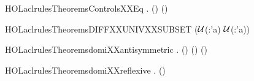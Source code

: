 \newcommand{\HOLaclrulesTheoremsandXXsaysXXlemma}{\UseVerbatim{HOLaclrulesTheoremsandXXsaysXXlemma}}
\begin{SaveVerbatim}{HOLaclrulesTheoremsControlsXXEq}
\HOLTokenTurnstile{} \HOLSymConst{\HOLTokenForall{}}    .
     (\HOLSymConst{,}\HOLSymConst{,})     \HOLSymConst{\HOLTokenEquiv{}} (\HOLSymConst{,}\HOLSymConst{,})      
\end{SaveVerbatim}
\newcommand{\HOLaclrulesTheoremsControlsXXEq}{\UseVerbatim{HOLaclrulesTheoremsControlsXXEq}}
\begin{SaveVerbatim}{HOLaclrulesTheoremsDIFFXXUNIVXXSUBSET}
\HOLTokenTurnstile{} (\ensuremath{\cal{U}}(:'a)   \HOLConst{\HOLTokenUnion{}}  \HOLSymConst{=} \ensuremath{\cal{U}}(:'a)) \HOLSymConst{\HOLTokenEquiv{}}  \HOLConst{\HOLTokenSubset{}} 
\end{SaveVerbatim}
\newcommand{\HOLaclrulesTheoremsDIFFXXUNIVXXSUBSET}{\UseVerbatim{HOLaclrulesTheoremsDIFFXXUNIVXXSUBSET}}
\begin{SaveVerbatim}{HOLaclrulesTheoremsdomiXXantisymmetric}
\HOLTokenTurnstile{} \HOLSymConst{\HOLTokenForall{}}    .
     (\HOLSymConst{,}\HOLSymConst{,})     \HOLSymConst{\HOLTokenImp{}}
     (\HOLSymConst{,}\HOLSymConst{,})     \HOLSymConst{\HOLTokenImp{}}
     (\HOLSymConst{,}\HOLSymConst{,})    
\end{SaveVerbatim}
\newcommand{\HOLaclrulesTheoremsdomiXXantisymmetric}{\UseVerbatim{HOLaclrulesTheoremsdomiXXantisymmetric}}
\begin{SaveVerbatim}{HOLaclrulesTheoremsdomiXXreflexive}
\HOLTokenTurnstile{} \HOLSymConst{\HOLTokenForall{}}   . (\HOLSymConst{,}\HOLSymConst{,})    
\end{SaveVerbatim}
